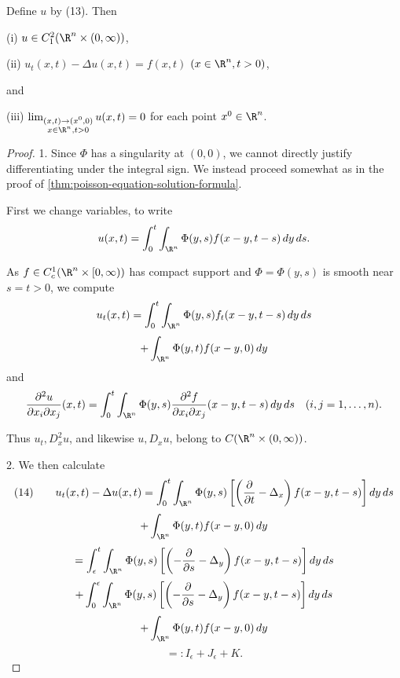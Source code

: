 \begin{theorem}
\label{thm:heat-equation-nonhomogeneous-solution}
Define $u$ by (13). Then

(i) $u \in C^2_1(\R^n \times (0,\infty))$,

(ii) $u_t(x,t) - \Delta u(x,t) = f(x,t)$ $(x \in \R^n, t > 0)$,

and

(iii) $\lim_{\substack{(x,t) \to (x^0,0) \\ x \in \R^n, t > 0}} u(x,t) = 0$ for each point $x^0 \in \R^n$.
\end{theorem}

\begin{proof}
1. Since $\Phi$ has a singularity at $(0,0)$, we cannot directly justify differentiating under the integral sign. We instead proceed somewhat as in the proof of \cref{thm:poisson-equation-solution-formula}.

First we change variables, to write
$$u(x,t) = \int_0^t \int_{\R^n} \Phi(y,s)f(x-y, t-s) \, dy \, ds.$$

As $f \in C_c^1(\R^n \times [0,\infty))$ has compact support and $\Phi = \Phi(y,s)$ is smooth near $s = t > 0$, we compute
$$u_t(x,t) = \int_0^t \int_{\R^n} \Phi(y,s)f_t(x-y, t-s) \, dy \, ds$$
$$+ \int_{\R^n} \Phi(y,t)f(x-y, 0) \, dy$$
and
$$\frac{\partial^2 u}{\partial x_i \partial x_j}(x,t) = \int_0^t \int_{\R^n} \Phi(y,s) \frac{\partial^2 f}{\partial x_i \partial x_j}(x-y, t-s) \, dy \, ds \quad (i,j = 1,\ldots,n).$$

Thus $u_t, D^2_x u$, and likewise $u, D_x u$, belong to $C(\R^n \times (0,\infty))$.

2. We then calculate
$$(14) \qquad u_t(x,t) - \Delta u(x,t) = \int_0^t \int_{\R^n} \Phi(y,s)\left[\left(\frac{\partial}{\partial t} - \Delta_x\right)f(x-y, t-s)\right] dy \, ds$$
$$+ \int_{\R^n} \Phi(y,t)f(x-y, 0) \, dy$$
$$= \int_\epsilon^t \int_{\R^n} \Phi(y,s)\left[\left(-\frac{\partial}{\partial s} - \Delta_y\right)f(x-y, t-s)\right] dy \, ds$$
$$+ \int_0^\epsilon \int_{\R^n} \Phi(y,s)\left[\left(-\frac{\partial}{\partial s} - \Delta_y\right)f(x-y, t-s)\right] dy \, ds$$
$$+ \int_{\R^n} \Phi(y,t)f(x-y, 0) \, dy$$
$$=: I_\epsilon + J_\epsilon + K.$$


\end{proof}
